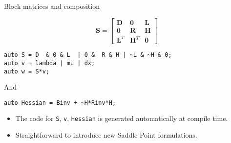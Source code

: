 \documentclass[9pt]{beamer}
\newcommand{\op}[1]{\mathrm{\mathbf{#1}}}
\begin{document}
\begin{frame}[fragile]{Block matrices and composition}

$$\op{S} = \begin{bmatrix}  \op{D} & \op{0} &  \op{L}  \\ \op{0} & \op{R} & \op{H} \\   \op{L}^T  &  \op{H}^T  & \op{0} \end{bmatrix} $$

\begin{lstlisting}
auto S = D  & 0 & L  | 0 &  R & H | ~L & ~H & 0;
auto v = lambda | mu | dx;
auto w = S*v;
\end{lstlisting}

And

\begin{lstlisting}
auto Hessian = Binv + ~H*Rinv*H;
\end{lstlisting}

\begin{itemize}
  \item The code for \lstinline|S|, \lstinline|v|, \lstinline|Hessian| is generated automatically at compile time.
  \item Straightforward to introduce new Saddle Point formulations.
\end{itemize}

\end{frame}
\end{document}
